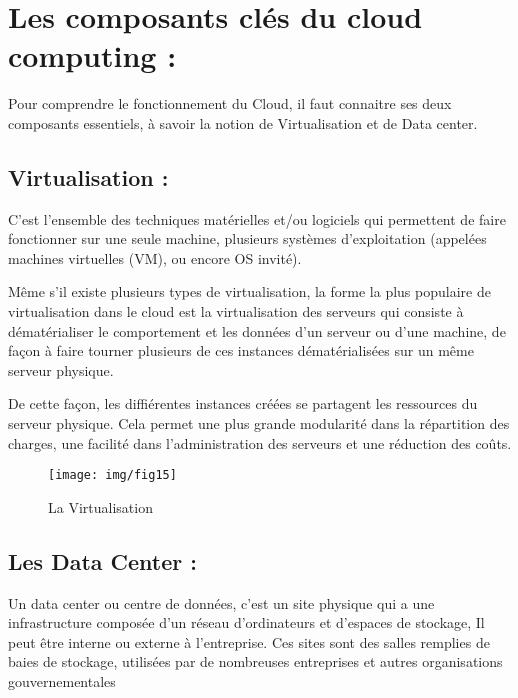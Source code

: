 \section{Les composants clés du cloud computing :}
Pour comprendre le fonctionnement du Cloud, il faut connaitre ses deux composants essentiels, à savoir la notion de Virtualisation et de Data center.

\subsection{Virtualisation :}
C'est l'ensemble des techniques matérielles et/ou logiciels qui permettent de faire fonctionner sur une seule machine, plusieurs systèmes d'exploitation (appelées machines virtuelles (VM), ou encore OS invité).

Même s'il existe plusieurs types de virtualisation, la forme la plus populaire de virtualisation dans le cloud est la virtualisation des serveurs qui consiste à dématérialiser le comportement et les données d'un serveur ou d'une machine, de façon à faire tourner plusieurs de ces instances dématérialisées sur un même serveur physique.

De cette façon, les diffiérentes instances créées se partagent les ressources du serveur physique. Cela permet une plus grande modularité dans la répartition des charges, une facilité dans l'administration des serveurs et une réduction des coûts.

\begin{figure}[h]
	\centering
	\texttt{[image: img/fig15]}
	\caption{La Virtualisation}
\end{figure}

\subsection{Les Data Center :}
Un data center ou centre de données, c'est un site physique qui a une infrastructure composée d'un réseau d'ordinateurs et d'espaces de stockage, Il peut être interne ou externe à l'entreprise. Ces sites sont des salles remplies de baies de stockage, utilisées par de nombreuses entreprises et autres organisations gouvernementales

